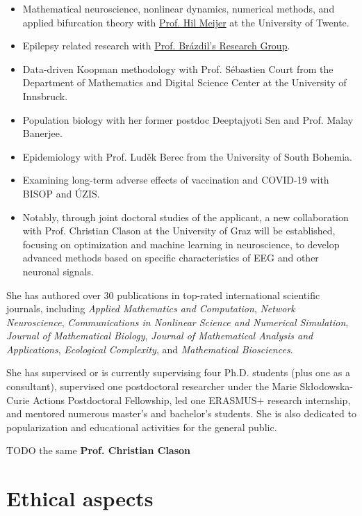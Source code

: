 \documentclass[a4paper,11pt]{scrartcl}
\begin{document}
\begin{itemize}
    \item Mathematical neuroscience, nonlinear dynamics, numerical methods, and applied bifurcation theory with \href{https://people.utwente.nl/h.g.e.meijer}{Prof. Hil Meijer} at the University of Twente.
    \item Epilepsy related research with \href{https://www.muni.cz/en/about-us/organizational-structure/ceitec/714004-milan-brazdil-rg}{Prof. Brázdil's Research Group}.
    \item Data-driven Koopman methodology with Prof. Sébastien Court from the Department of Mathematics and Digital Science Center at the University of Innsbruck.
    \item Population biology with her former postdoc Deeptajyoti Sen and Prof. Malay Banerjee.
    \item Epidemiology with Prof. Luděk Berec from the University of South Bohemia.
    \item Examining long-term adverse effects of vaccination and COVID-19 with BISOP and ÚZIS.
    \item Notably, through joint doctoral studies of the applicant, a new collaboration with Prof. Christian Clason at the University of Graz will be established, focusing on optimization and machine learning in neuroscience, to develop advanced methods based on specific  characteristics of EEG and other neuronal signals. 
\end{itemize}

She has authored over 30 publications in top-rated international scientific journals, including \textit{Applied Mathematics and Computation}, \textit{Network Neuroscience}, \textit{Communications in Nonlinear Science and Numerical Simulation}, \textit{Journal of Mathematical Biology}, \textit{Journal of Mathematical Analysis and Applications}, \textit{Ecological Complexity}, and \textit{Mathematical Biosciences}.

She has supervised or is currently supervising four Ph.D. students (plus one as a consultant), supervised one postdoctoral researcher under the Marie Skłodowska-Curie Actions Postdoctoral Fellowship, led one ERASMUS+ research internship, and mentored numerous master's and bachelor's students. She is also dedicated to popularization and educational activities for the general public.


TODO the same \textbf{Prof. Christian Clason}


\section{Ethical aspects}\label{sec:ethics}
\end{document}
